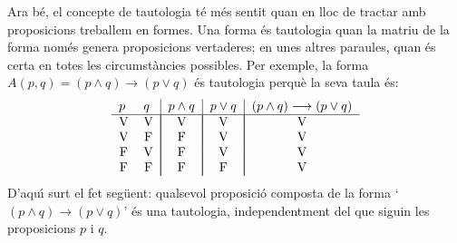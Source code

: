 Ara b\'{e}, el concepte de tautologia t\'{e} m\'{e}s sentit quan en lloc de
tractar amb proposicions treballem en formes. Una forma \'{e}s tautologia
quan la matriu de la forma nom\'{e}s genera proposicions vertaderes; en unes
altres paraules, quan \'{e}s certa en totes les circumst\`{a}ncies
possibles. Per exemple, la forma $A(p,q)=(p\wedge q)\longrightarrow(p\vee q)
$ \'{e}s tautologia perqu\`{e} la seva taula \'{e}s:%
\begin{equation*}
\begin{tabular}{ll|l|l|l}
$p$ & $q$ & $p\wedge q$ & $p\vee q$ & $(p\wedge q)\longrightarrow(p\vee q)$
\\ \hline
\multicolumn{1}{c}{V} & \multicolumn{1}{c|}{V} & \multicolumn{1}{|c|}{V} &
\multicolumn{1}{|c|}{V} & \multicolumn{1}{|c}{V} \\
\multicolumn{1}{c}{V} & \multicolumn{1}{c|}{F} & \multicolumn{1}{|c|}{F} &
\multicolumn{1}{|c|}{V} & \multicolumn{1}{|c}{V} \\
\multicolumn{1}{c}{F} & \multicolumn{1}{c|}{V} & \multicolumn{1}{|c|}{F} &
\multicolumn{1}{|c|}{V} & \multicolumn{1}{|c}{V} \\
\multicolumn{1}{c}{F} & \multicolumn{1}{c|}{F} & \multicolumn{1}{|c|}{F} &
\multicolumn{1}{|c|}{F} & \multicolumn{1}{|c}{V}%
\end{tabular}
\end{equation*}
D'aqu\'{\i} surt el fet seg\"{u}ent: qualsevol proposici\'{o} composta de la
forma `$(p\wedge q)\longrightarrow(p\vee q)$' \'{e}s una tautologia,
independentment del que siguin les proposicions $p$ i $q$.

\bigskip

